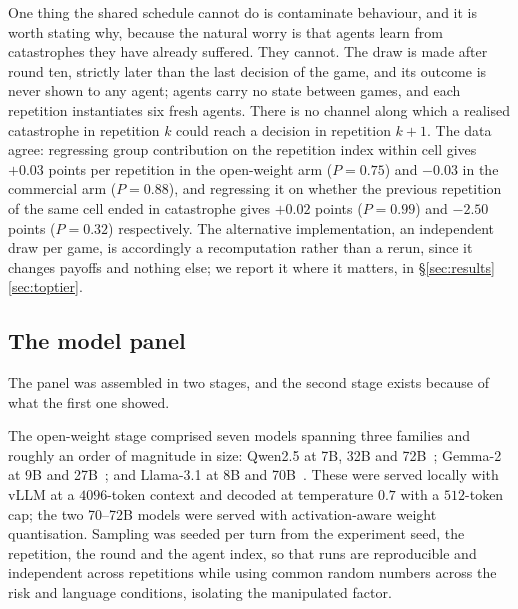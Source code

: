 \documentclass[openacc]{rsproca_new}
\begin{document}
One thing the shared schedule cannot do is contaminate behaviour, and it is worth stating why, because the natural worry is that agents learn from catastrophes they have already suffered. They cannot. The draw is made after round ten, strictly later than the last decision of the game, and its outcome is never shown to any agent; agents carry no state between games, and each repetition instantiates six fresh agents. There is no channel along which a realised catastrophe in repetition $k$ could reach a decision in repetition $k+1$. The data agree: regressing group contribution on the repetition index within cell gives $+0.03$ points per repetition in the open-weight arm ($P=0.75$) and $-0.03$ in the commercial arm ($P=0.88$), and regressing it on whether the previous repetition of the same cell ended in catastrophe gives $+0.02$ points ($P=0.99$) and $-2.50$ points ($P=0.32$) respectively. The alternative implementation, an independent draw per game, is accordingly a recomputation rather than a rerun, since it changes payoffs and nothing else; we report it where it matters, in \S\ref{sec:results}\ref{sec:toptier}.

\subsection{The model panel}
\label{sec:panel}
The panel was assembled in two stages, and the second stage exists because of what the first one showed.

The open-weight stage comprised seven models spanning three families and roughly an order of magnitude in size: Qwen2.5 at 7B, 32B and 72B~\cite{qwen2025qwen25}; Gemma-2 at 9B and 27B~\cite{gemma2024gemma2}; and Llama-3.1 at 8B and 70B~\cite{grattafiori2024llama3}. These were served locally with vLLM at a $4096$-token context and decoded at temperature $0.7$ with a $512$-token cap; the two 70--72B models were served with activation-aware weight quantisation. Sampling was seeded per turn from the experiment seed, the repetition, the round and the agent index, so that runs are reproducible and independent across repetitions while using common random numbers across the risk and language conditions, isolating the manipulated factor.
\end{document}
